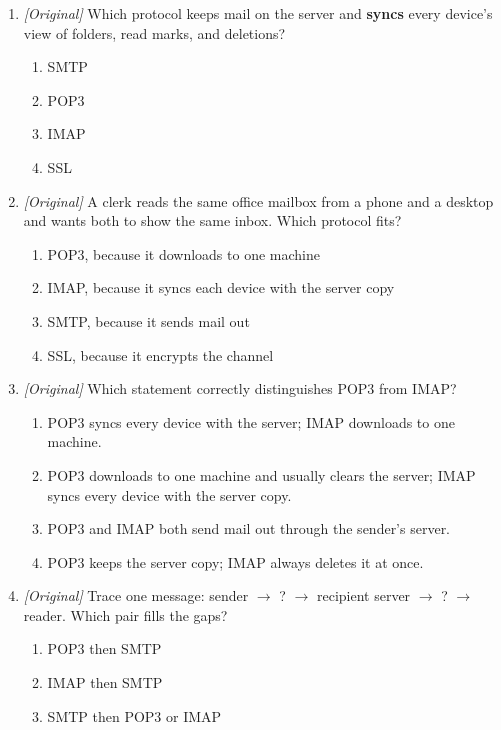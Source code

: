 \begin{enumerate}[label=\textbf{Q\arabic*.}, leftmargin=*]
\begin{enumerate}[label=\Alph*.]
    \item IMAP
    \item TLS
  \end{enumerate}
\item \textit{[Original]} Which protocol keeps mail on the server and
  \textbf{syncs} every device's view of folders, read marks, and deletions?
  \begin{enumerate}[label=\Alph*.]
    \item SMTP
    \item POP3
    \item IMAP
    \item SSL
  \end{enumerate}
\item \textit{[Original]} A clerk reads the same office mailbox from a phone
  and a desktop and wants both to show the same inbox. Which protocol fits?
  \begin{enumerate}[label=\Alph*.]
    \item POP3, because it downloads to one machine
    \item IMAP, because it syncs each device with the server copy
    \item SMTP, because it sends mail out
    \item SSL, because it encrypts the channel
  \end{enumerate}
\item \textit{[Original]} Which statement correctly distinguishes POP3 from
  IMAP?
  \begin{enumerate}[label=\Alph*.]
    \item POP3 syncs every device with the server; IMAP downloads to one machine.
    \item POP3 downloads to one machine and usually clears the server; IMAP syncs every device with the server copy.
    \item POP3 and IMAP both send mail out through the sender's server.
    \item POP3 keeps the server copy; IMAP always deletes it at once.
  \end{enumerate}
\item \textit{[Original]} Trace one message: sender $\rightarrow$ ? $\rightarrow$
  recipient server $\rightarrow$ ? $\rightarrow$ reader. Which pair fills the
  gaps?
  \begin{enumerate}[label=\Alph*.]
    \item POP3 then SMTP
    \item IMAP then SMTP
    \item SMTP then POP3 or IMAP

\end{enumerate}
\end{enumerate}
